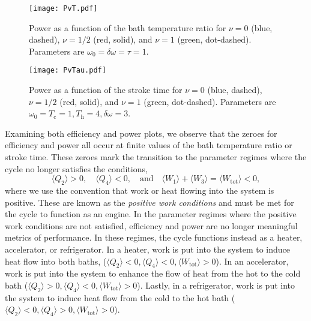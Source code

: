 \documentclass[preprints,article,accept,moreauthors,pdftex]{Definitions/mdpi}
\begin{document}
\vspace{-6pt}

\begin{figure}[H]
	\texttt{[image: PvT.pdf]}
	\caption{\label{PvTFig} Power as a function of the bath temperature ratio for $\nu = 0$ (blue, dashed), $\nu = 1/2$ (red, solid), and $\nu = 1$ (green, dot-dashed). Parameters are $\omega_0 = \delta\omega = \tau = 1$.}
\end{figure}

\vspace{-6pt}

\begin{figure}[H]
	\texttt{[image: PvTau.pdf]}
	\caption{\label{PvTauFig} Power as a function of the stroke time for $\nu = 0$ (blue, dashed), $\nu = 1/2$ (red, solid), and $\nu = 1$ (green, dot-dashed). Parameters are $\omega_0 = T_{\mathrm{c}} = 1, T_{\mathrm{h}} = 4, \delta\omega = 3$.}
\end{figure}

Examining both efficiency and power plots, we observe that the zeroes for efficiency and power all occur at finite values of the bath temperature ratio or stroke time. These zeroes mark the transition to the parameter regimes where the cycle no longer satisfies the conditions,
\begin{equation}
	\langle Q_2 \rangle > 0, \quad \langle Q_4 \rangle < 0, \quad \text{and}\quad \langle W_1 \rangle + \langle W_3 \rangle = \langle W_{\mathrm{tot}} \rangle < 0, 
\end{equation}
where we use the convention that work or heat flowing into the system is positive.
These are known as the \textit{positive work conditions} and must be met for the cycle to function as an engine. In the parameter regimes where the positive work conditions are not satisfied, efficiency and power are no longer meaningful metrics of performance. In these regimes, the cycle functions instead as a heater, accelerator, or refrigerator. In a heater, work is put into the system to induce heat flow into both baths, ($\langle Q_2 \rangle < 0, \langle Q_4 \rangle < 0, \langle W_{\mathrm{tot}} \rangle > 0$). In an accelerator, work is put into the system to enhance the flow of heat from the hot to the cold bath ($\langle Q_2 \rangle > 0, \langle Q_4 \rangle < 0, \langle W_{\mathrm{tot}} \rangle > 0$). Lastly, in a refrigerator, work is put into the system to induce heat flow from the cold to the hot bath ($\langle Q_2 \rangle < 0, \langle Q_4 \rangle > 0, \langle W_{\mathrm{tot}} \rangle > 0$). 
\end{document}

